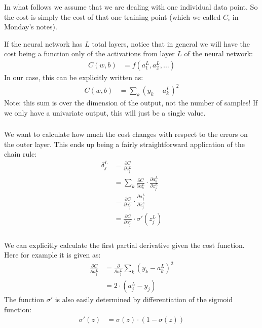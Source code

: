 \documentclass[xetex,mathserif,serif,aspectratio=169]{beamer}
\begin{document}
\begin{frame}[fragile] \frametitle{} \oldB \small


In what follows we assume that we are dealing with one individual
data point. So the cost is simply the cost of that one training
point (which we called $C_i$ in Monday's notes).

If the neural network has $L$ total layers, notice that in
general we will have the cost being a function only of the
activations from layer $L$ of the neural network:
\begin{align*}
C(w, b) &= f(a_1^L, a_2^L, \ldots)
\end{align*}
In our case, this can be explicitly written as:
\begin{align*}
C(w, b) &= \sum_k (y_k - a_k^L)^2
\end{align*}
Note: this sum is over the dimension of the output, not the
number of samples! If we only have a univariate output, this
will just be a single value.

\end{frame}

\begin{frame}[fragile] \frametitle{} \oldB \small


We want to calculate how much the cost changes with respect to the
errors on the outer layer. This ends up being a fairly straightforward
application of the chain rule:
\begin{align*}
\delta_j^L &= \frac{\partial C}{ \partial z_j^L} \\
&= \sum_k \frac{\partial C}{ \partial a_k^L} \cdot \frac{\partial a_k^L}{ \partial z_j^L} \\
&= \frac{\partial C}{ \partial a_j^L} \cdot \frac{\partial a_j^L}{ \partial z_j^L} \\
&= \frac{\partial C}{ \partial a_j^L} \cdot \sigma'(z_j^L)
\end{align*}

\end{frame}

\begin{frame}[fragile] \frametitle{} \oldB \small


We can explicitly calculate the first partial derivative given the cost
function. Here for example it is given as:
\begin{align*}
\frac{\partial C}{ \partial a_j^L} &= \frac{\partial}{ \partial a_j^L} \sum_k (y_k - a_k^L)^2 \\
&= 2 \cdot (a_j^L - y_j)
\end{align*}
The function $\sigma'$ is also easily determined by differentiation of the sigmoid
function:
\begin{align*}
\sigma'(z) &= \sigma(z) \cdot (1 - \sigma(z))
\end{align*}

\end{frame}
\end{document}
